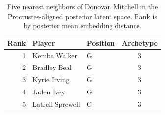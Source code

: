 \begin{table}[htbp]
  \centering\small
  \begin{tabular}{rllc}
    \toprule
    Rank & Player & Position & Archetype \\
    \midrule
    1 & Kemba Walker & G & 3 \\
    2 & Bradley Beal & G & 3 \\
    3 & Kyrie Irving & G & 3 \\
    4 & Jaden Ivey & G & 3 \\
    5 & Latrell Sprewell & G & 3 \\
    \bottomrule
  \end{tabular}
  \caption{Five nearest neighbors of Donovan Mitchell in the Procrustes-aligned posterior latent space. Rank is by posterior mean embedding distance.}
  \label{tab:Donovan_Mitchell_neighbors}
\end{table}

